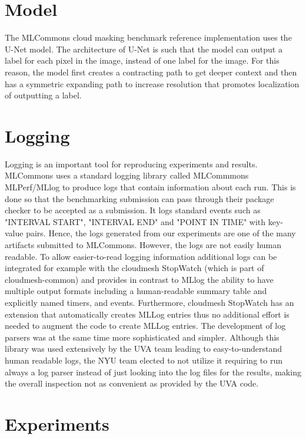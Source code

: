 \documentclass[sigplan,screen]{acmart}
\begin{document}
\section{Model}

The MLCommons cloud masking benchmark \cite{Thiyagalingam2022AIBF} reference implementation uses the U-Net \cite{Ronneberger2015UNetCN} model. The architecture of U-Net is such that the model can output a label for each pixel in the image, instead of one label for the image. For this reason, the model first creates a contracting path to get deeper context and then has a symmetric expanding path to increase resolution that promotes localization of outputting a label.

\section{Logging}

Logging is an important tool for reproducing experiments and results. MLCommons uses a standard logging library called MLCommmons MLPerf/MLlog \cite{github-mlcommons-logging} to produce logs that contain information about each run. This is done so that the benchmarking submission can pass through their package checker to be accepted as a submission. It logs standard events such as "INTERVAL START", "INTERVAL END" and "POINT IN TIME" with key-value pairs. Hence, the logs generated from our experiments are one of the many artifacts submitted to MLCommons. 
However, the logs are not easily human readable. To allow easier-to-read logging information additional logs can be integrated for example with the cloudmesh StopWatch  (which is part of cloudmesh-common) \citep{cloudmesh-stopwatch} and provides in contrast to MLlog the ability to have multiple output formats including a human-readable summary table and explicitly named timers, and events.  Furthermore, cloudmesh StopWatch has an extension that automatically creates MLLog entries thus no additional effort is needed to augment the code to create MLLog entries. The development of log parsers was at the same time more sophisticated and simpler. Although this library was used extensively by the UVA team leading to easy-to-understand human readable logs, the NYU team elected to not utilize it requiring to run always a log parser instead of just looking into the log files for the results, making the overall inspection not as convenient as provided by the UVA code.

\section{Experiments}
\label{sec:exp}
\end{document}
